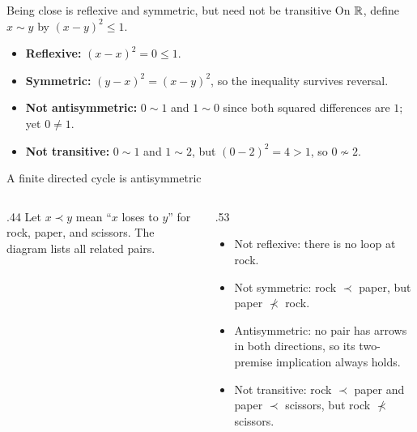 \begin{frame}{Being close is reflexive and symmetric, but need not be transitive}
On $\mathbb{R}$, define $x\sim y$ by $(x-y)^2\le1$.
\begin{itemize}
\item \textbf{Reflexive:} $(x-x)^2=0\le1$.
\item \textbf{Symmetric:} $(y-x)^2=(x-y)^2$, so the inequality survives reversal.
\item \textbf{Not antisymmetric:} $0\sim1$ and $1\sim0$ since both squared differences are $1$;
yet $0\ne1$.
\item \textbf{Not transitive:} $0\sim1$ and $1\sim2$, but $(0-2)^2=4>1$, so $0\not\sim2$.
\end{itemize}
\begin{center}
\end{center}
\end{frame}

\begin{frame}{A finite directed cycle is antisymmetric}
\begin{columns}[T]
\begin{column}{.44\textwidth}
Let $x\prec y$ mean ``$x$ loses to $y$'' for rock, paper, and scissors.
The diagram lists all related pairs.
\begin{center}
\end{center}
\end{column}
\begin{column}{.53\textwidth}
\begin{itemize}
\item Not reflexive: there is no loop at rock.
\item Not symmetric: rock $\prec$ paper, but paper $\not\prec$ rock.
\item Antisymmetric: no pair has arrows in both directions, so its two-premise implication always holds.
\item Not transitive: rock $\prec$ paper and paper $\prec$ scissors, but rock $\not\prec$ scissors.
\end{itemize}
\end{column}
\end{columns}
\end{frame}

